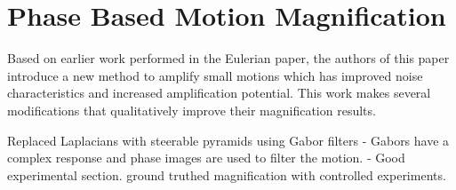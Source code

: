 \documentclass[letterpaper]{article}
\date{\today}
\begin{document}
\maketitle

\section{Phase Based Motion Magnification}

Based on earlier work performed in the Eulerian paper, the authors of
this paper introduce a new method to amplify small motions which has
improved noise characteristics and increased amplification potential.
This work makes several modifications that qualitatively improve their
magnification results.

Replaced Laplacians with steerable pyramids using Gabor filters -
Gabors have a complex response and phase images are used to filter the
motion.  - Good experimental section. ground truthed magnification
with controlled experiments.




\end{document}
